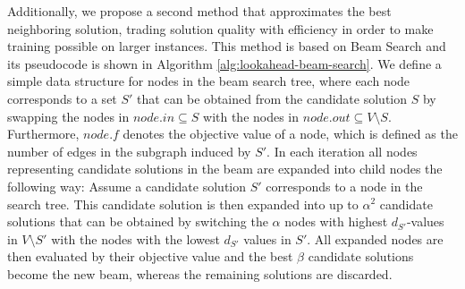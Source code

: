 \documentclass[draft,final]{vutinfth} %
\begin{document}
Additionally, we propose a second method that approximates the best neighboring solution, trading solution quality with efficiency in order to make training possible on larger instances. This method is based on Beam Search and its pseudocode is shown in Algorithm \ref{alg:lookahead-beam-search}. We define a simple data structure for nodes in the beam search tree, where each node corresponds to a set $S'$ that can be obtained from the candidate solution $S$ by swapping the nodes in $node.in \subseteq S$ with the nodes in $node.out \subseteq V\setminus S$. Furthermore, $node.f$ denotes the objective value of a node, which is defined as the number of edges in the subgraph induced by $S'$. 
In each iteration all nodes representing candidate solutions in the beam are expanded into child nodes the following way: Assume a candidate solution $S'$ corresponds to a node in the search tree. This candidate solution is then expanded into up to $\alpha^2$ candidate solutions that can be obtained by switching the $\alpha$ nodes with highest $d_{S'}$-values in $V \setminus S'$ with the nodes with the lowest $d_{S'}$ values in $S'$. All expanded nodes are then evaluated by their objective value and the best $\beta$ candidate solutions become the new beam, whereas the remaining solutions are discarded.
\end{document}
